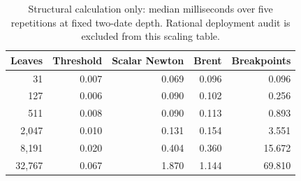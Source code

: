 \begin{table}[htbp]
\centering
\caption{Structural calculation only: median milliseconds over five repetitions at fixed two-date depth. Rational deployment audit is excluded from this scaling table.}
\label{tab:r14-scaling}
\begin{tabular}{rrrrr}
\toprule
Leaves & Threshold & Scalar Newton & Brent & Breakpoints\\
\midrule
31 & 0.007 & 0.069 & 0.096 & 0.096\\
127 & 0.006 & 0.090 & 0.102 & 0.256\\
511 & 0.008 & 0.090 & 0.113 & 0.893\\
2,047 & 0.010 & 0.131 & 0.154 & 3.551\\
8,191 & 0.020 & 0.404 & 0.360 & 15.672\\
32,767 & 0.067 & 1.870 & 1.144 & 69.810\\
\bottomrule\end{tabular}\end{table}
